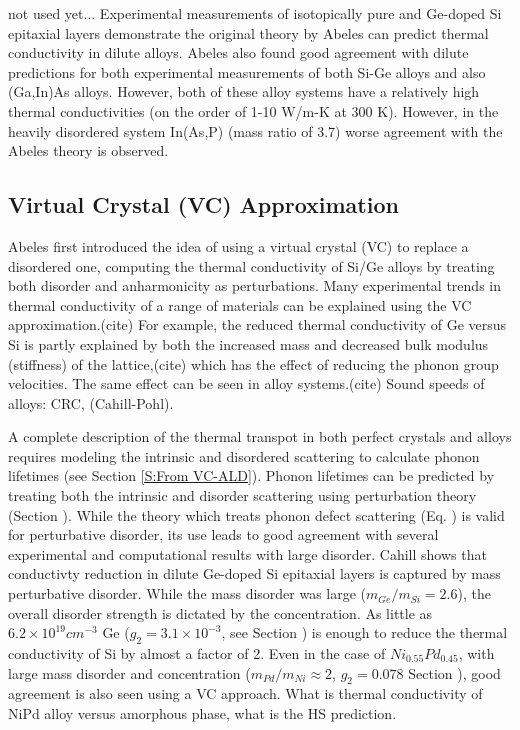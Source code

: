 \documentclass[aps,prb,onecolumn,preprint,superscriptaddress,amsmath,amssymb,floatfix]{revtex4}
\begin{document}
not used yet...
Experimental measurements of isotopically pure and Ge-doped 
Si epitaxial layers demonstrate the original theory by Abeles can predict 
thermal conductivity in dilute alloys. Abeles also found good agreement 
with dilute predictions for both experimental measurements of both 
Si-Ge alloys and also (Ga,In)As alloys.\cite{abeles_lattice_1963} However, 
both of these alloy systems have a relatively high thermal conductivities 
(on the order of 1-10 W/m-K at 300 K). However, in the heavily disordered 
system In(As,P) (mass ratio of 3.7) worse agreement with the Abeles theory 
is observed. 

\subsection{\label{S:Virtual Crystal}Virtual Crystal (VC) Approximation}

Abeles first introduced the idea of using a virtual crystal (VC) to 
replace a disordered one, computing the
thermal conductivity of Si/Ge alloys by treating both
disorder and anharmonicity as perturbations.\cite{abeles_lattice_1963} 
Many experimental trends in thermal conductivity 
of a range of materials 
can be explained using the VC approximation.(cite) For example,
the reduced thermal conductivity of Ge versus Si is partly explained 
by both the increased mass and decreased bulk modulus (stiffness) of the 
lattice,(cite) which has the effect of reducing the phonon group 
velocities. The same effect can be seen in alloy systems.(cite)
Sound speeds of alloys: CRC, (Cahill-Pohl).

A complete 
description of the thermal transpot in both perfect crystals and alloys 
requires modeling the intrinsic 
and disordered scattering to calculate phonon lifetimes 
(see Section \ref{S:From VC-ALD}).
Phonon lifetimes can be predicted by treating both the intrinsic 
and disorder scattering using perturbation theory (Section ). 
While the theory which treats phonon defect scattering (Eq. ) 
is valid for
perturbative disorder, its use leads to good agreement with
several experimental and computational results with large disorder.  
Cahill shows that conductivty reduction in dilute 
Ge-doped Si epitaxial layers 
is captured by mass perturbative disorder.
\cite{cahill_thermal_2004,cahill_thermal_2005} 
While the mass disorder was large ($m_{Ge}/m_{Si} = 2.6$),  
the overall disorder strength is dictated by the concentration. 
As little as $6.2\times10^{19} cm^{-3}$ Ge
($g_2 = 3.1\times10^{-3}$, see Section ) 
is enough to reduce the thermal conductivity of 
Si by almost a factor of 2.\cite{cahill_thermal_2004}
Even in the
case of $Ni_{0.55}Pd_{0.45}$, with large mass disorder and 
concentration ($m_{Pd}/m_{Ni} \approx 2$, $g_2=0.078$ Section ), 
good agreement is also seen using a VC approach.
\cite{kamitakahara_vibrations_1974} What is thermal conductivity 
of NiPd alloy versus amorphous phase, what is the HS prediction.
\end{document}
